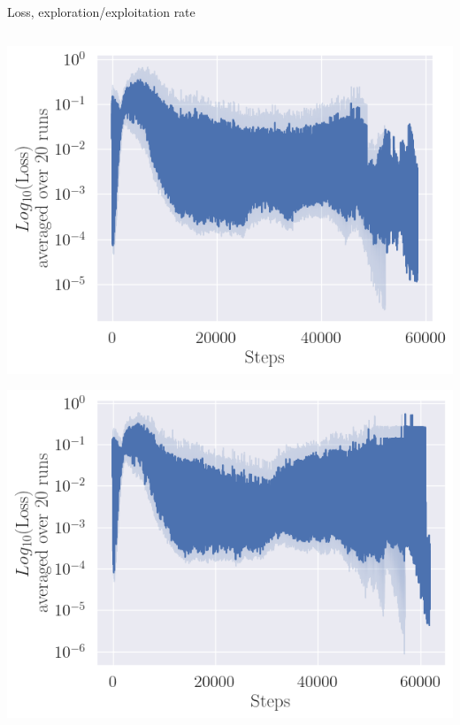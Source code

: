 \documentclass[bigger]{beamer}
\begin{document}
\begin{frame}[label={sec:org23cd4ca}]{Loss, exploration/exploitation rate}
\begin{columns}
\begin{column}{0.5\columnwidth}
\begin{center}
\includegraphics[width=.9\linewidth]{img/loss_upper-then-lower1.png}
\end{center}
\begin{center}
\includegraphics[width=.9\linewidth]{img/loss_upper-then-lower2.png}
\end{center}
\end{column}
\end{columns}
\end{frame}
\end{document}
